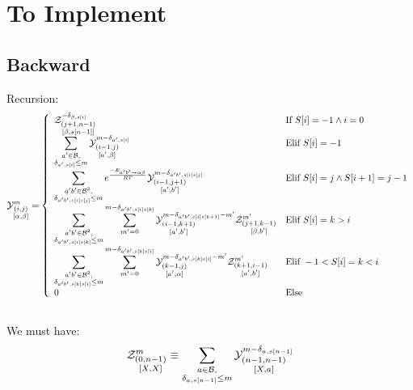 \documentclass[11pt]{article} %
\begin{document}
\section{To Implement}
\subsection{Backward}	
Recursion:
$$
	\Y{i,j}{m}{\alpha,\beta} = \left\{
  \begin{array}{ll}
  	 \displaystyle
		 \Z{j+1,n-1}{-\Kron_{\beta,s[i]}}{\beta,s[n-1]} & \text{If }S[i]=-1 \land i = 0\\
    \displaystyle
    \sum_{\substack{a'\in \B,\\ \Kron_{a',s[i]}\le m}}
    \Y{i-1,j}{m- \Kron_{a',s[i]}}{a',\beta} &
    \text{Elif }S[i]=-1\\
    \displaystyle
    \sum_{\substack{a'b'\in \B^2,\\ \Kron_{a'b',s[i]s[j]}\le m}}
		 e^{\frac{-E_{ a' b' \to \alpha \beta }}{RT}}
    \Y{i-1,j+1}{m- \Kron_{a'b',s[i]s[j]}}{a',b'} &
   	 \text{Elif }S{[i]}=j \land S{[i+1]}=j-1\\
		 \displaystyle
		 \sum_{\substack{a'b'\in \B^2,\\ \Kron_{a'b',s[i]s[k]}\le m}}
		 \sum_{m'=0}^{m-\Kron_{a'b',s[i]s[k]}}
		 \Y{i-1,k+1}{m- \Kron_{a'b',s[i]s[k+1]} - m'}{a',b'}
     \Z{j+1,k-1}{m'}{\beta,b'} &
		 \text{Elif }S{[i]}=k > i\\
		 \displaystyle
		 \sum_{\substack{a'b'\in \B^2,\\ \Kron_{a'b',s[k]s[i]}\le m}}
		 \sum_{m'=0}^{m-\Kron_{a'b',s[k]s[i]}}
		 \Y{k-1,j}{m- \Kron_{a'b',s[k]s[i]} - m'}{a',\alpha}
     \Z{k+1,i-1}{m'}{a',b'} &
		 \text{Elif }-1 < S{[i]}=k < i\\
		 0 & \text{Else}
  \end{array}\right.
$$
\subsection*{}
We must have:
$$
	\Z{0,n-1}{m}{X,X} \equiv     
	\sum_{\substack{a\in \B,\\ \Kron_{a,s[n-1]}\le m}}	
	\Y{n-1,n-1}{m-\Kron_{a,s[n-1]}}{X,a}
$$
\end{document}
